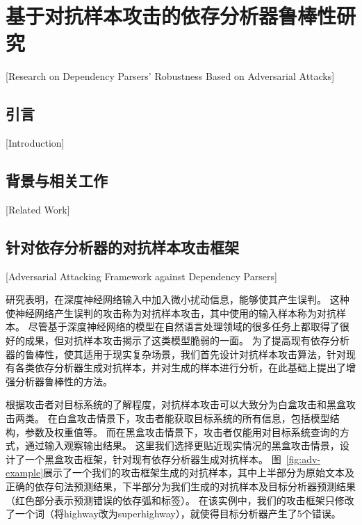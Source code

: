 
\chapter[基于对抗样本攻击的依存分析器鲁棒性研究]{基于对抗样本攻击的依存分析器鲁棒性研究}[Research on Dependency Parsers' Robustness Based on Adversarial Attacks]

\section{引言}[Introduction]

\section{背景与相关工作}[Related Work]

\section{针对依存分析器的对抗样本攻击框架}[Adversarial Attacking Framework against Dependency Parsers]

研究表明，在深度神经网络输入中加入微小扰动信息，能够使其产生误判。
这种使神经网络产生误判的攻击称为对抗样本攻击，其中使用的输入样本称为对抗样本。
尽管基于深度神经网络的模型在自然语言处理领域的很多任务上都取得了很好的成果，但对抗样本攻击揭示了这类模型脆弱的一面。
为了提高现有依存分析器的鲁棒性，使其适用于现实复杂场景，我们首先设计对抗样本攻击算法，针对现有各类依存分析器生成对抗样本，并对生成的样本进行分析，在此基础上提出了增强分析器鲁棒性的方法。

根据攻击者对目标系统的了解程度，对抗样本攻击可以大致分为白盒攻击和黑盒攻击两类。
在白盒攻击情景下，攻击者能获取目标系统的所有信息，包括模型结构，参数及权重值等。
而在黑盒攻击情景下，攻击者仅能用对目标系统查询的方式，通过输入观察输出结果。
这里我们选择更贴近现实情况的黑盒攻击情景，设计了一个黑盒攻击框架，针对现有依存分析器生成对抗样本。
图~\ref{fig:adv-example}展示了一个我们的攻击框架生成的对抗样本，其中上半部分为原始文本及正确的依存句法预测结果，下半部分为我们生成的对抗样本及目标分析器预测结果（红色部分表示预测错误的依存弧和标签）。
在该实例中，我们的攻击框架只修改了一个词（将highway改为superhighway），就使得目标分析器产生了5个错误。

